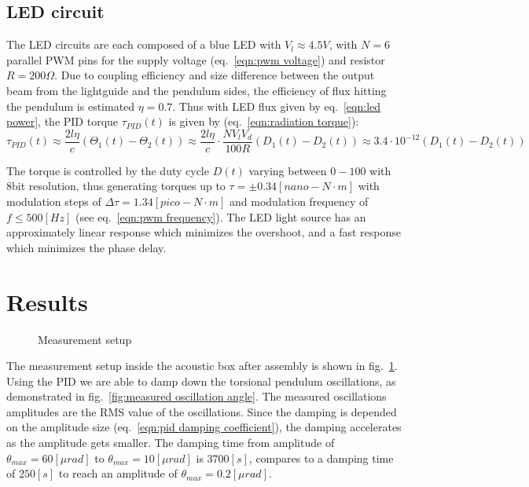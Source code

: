 \documentclass[\main/master.tex]{subfiles}
\begin{document}
\subsection{LED circuit}
The LED circuits are each composed of a blue LED with $V_l\approx 4.5V$, with $N=6$ parallel PWM pins for the supply voltage (eq.~\ref{eqn:pwm voltage}) and resistor $R = 200\Omega$. Due to coupling efficiency and size difference between the output beam from the lightguide and the pendulum sides, the efficiency of flux hitting the pendulum is estimated $\eta = 0.7$. Thus with LED flux given by eq.~\ref{eqn:led power}, the PID torque $\tau_{PID}(t)$ is given by (eq.~\ref{eqn:radiation torque}):
\begin{equation}
\tau_{PID}(t) \approx \frac{2l\eta}{{c}} (\Theta_1(t) -\Theta_2(t)) \approx \frac{2l\eta}{{c}} \cdot\frac{N V_l V_d}{100R}(D_1(t) -D_2(t))  \approx   3.4\cdot 10^{-12}(D_1(t) -D_2(t)) 
\label{eqn:led torque}
\end{equation}
\par\noindent
The torque is controlled by the duty cycle $D(t)$ varying between $0-100$ with 8bit resolution, thus generating torques up to $\tau = \pm 0.34 [nano-N\cdot m]$ with modulation steps of $\Delta\tau = 1.34 [pico-N\cdot m]$ and modulation frequency of $f \leq 500[Hz]$ (see eq.~\ref{eqn:pwm frequency}). The LED light source has an approximately linear response which minimizes the overshoot, and a fast response which minimizes the phase delay.
\newpage
\section{Results} 
\begin{figure}[htbp]
	\centering
	\caption[Measurement setup]{Measurement setup}
	\label{fig:actual system}
\end{figure}
\FloatBarrier
The measurement setup inside the acoustic box after assembly is shown in fig.~\ref{fig:actual system}. Using the PID we are able to damp down the torsional pendulum oscillations, as demonstrated in fig.~\ref{fig:measured oscillation angle}. The measured oscillations amplitudes are the RMS value of the oscillations. Since the damping is depended on the amplitude size (eq.~\ref{eqn:pid damping coefficient}), the damping accelerates as the amplitude gets smaller. The damping time from amplitude of $\theta_{max} = 60 [\mu rad] $ to $\theta_{max} = 10[\mu rad] $ is $3700[s]$, compares to a damping time of $250[s]$ to reach an amplitude of $\theta_{max} = 0.2[\mu rad]$.
\end{document}
